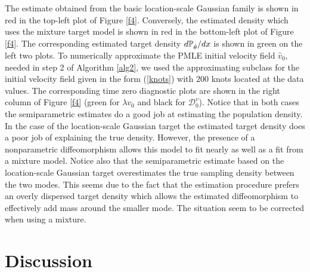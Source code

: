 \documentclass[noinfoline]{imsart}
\begin{document}
The estimate obtained from the basic location-scale Gaussian family is shown in red in the top-left plot of Figure \ref{f4}. Conversely, the estimated density which uses the mixture target model is shown in red in the bottom-left plot of Figure \ref{f4}.   The corresponding estimated target density $d\Bbb P_{\hat \theta}/dx$ is shown in green on the left two plots.
To numerically approximate the PMLE initial velocity field $\hat v_0$, needed in step 2 of Algorithm \ref{alg2},  we used the approximating subclass for the initial velocity field given in the form (\ref{knots}) with $200$ knots located at the data values.
The corresponding time zero diagnostic plots are shown in the right column of Figure \ref{f4} (green for $\lambda v_0$ and black for $\mathcal D_0^v$).
 Notice that in both cases the semiparametric estimates do a good job at estimating the population density.
In the case of the location-scale Gaussian target the estimated target density does a poor job of explaining the true density. However, the presence of a nonparametric diffeomorphism allows this model to fit nearly as well as a fit from a mixture model. Notice also that the semiparametric estimate based on the location-scale Gaussian target overestimates the true sampling density between the two modes. This seems due to the fact that the estimation procedure prefers an overly dispersed target density which  allows the estimated diffeomorphism to effectively add  mass around the smaller mode. The situation seem to be corrected when using a mixture.





\section{Discussion}
\end{document}
